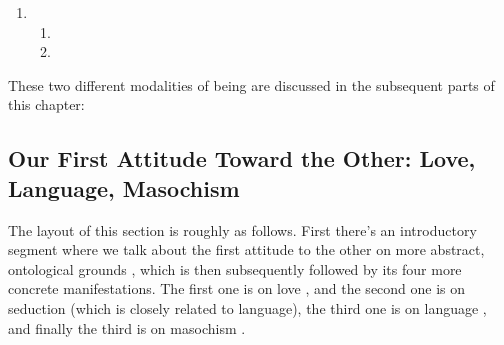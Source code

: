 \begin{enumerate}
  \item {}
  \begin{enumerate}
    \item {}
    \item {}
  \end{enumerate}
\end{enumerate}

\noindent
These two different modalities of being are discussed in the subsequent parts of this chapter:

\subsection{Our First Attitude Toward the Other: Love, Language, Masochism}

The layout of this section is roughly as follows. First there's an introductory segment where we talk about the first attitude to the other on more abstract, ontological grounds \autocite[482 -- 485]{sartre}, which is then subsequently followed by its four more concrete manifestations. The first one is on love \autocite[485 -- 493]{sartre}, and the second one is on seduction \autocite[492 -- 493]{sartre} (which is closely related to language), the third one is on language \autocite[493 -- 499]{sartre}, and finally the third is on masochism \autocite[499 -- 501]{sartre}.

